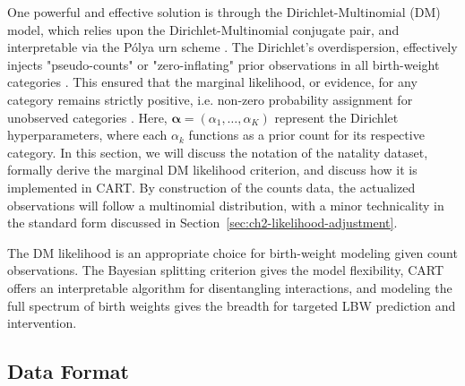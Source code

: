 One powerful and effective solution is through the Dirichlet-Multinomial (DM) model, which relies upon the Dirichlet-Multinomial conjugate pair, and interpretable via the Pólya urn scheme \citep{mimno_polya, gundersen2020dirichlet-multinomial, minka2000estimating}. The Dirichlet's overdispersion, effectively injects "pseudo-counts" or "zero-inflating" prior observations in all birth-weight categories \citep{mimno_polya, wiki:dirichlet-multinomial}. This ensured that the marginal likelihood, or evidence, for any category remains strictly positive, i.e. non-zero probability assignment for unobserved categories \citep{wiki:dirichlet-multinomial}. Here, \(\boldsymbol{\alpha} = (\alpha_1, \dots, \alpha_K)\) represent the Dirichlet hyperparameters, where each \(\alpha_k\) functions as a prior count for its respective category. In this section, we will discuss the notation of the natality dataset, formally derive the marginal DM likelihood criterion, and discuss how it is implemented in CART. By construction of the counts data, the actualized observations will follow a multinomial distribution, with a minor technicality in the standard form discussed in Section~\ref{sec:ch2-likelihood-adjustment}. 

The DM likelihood is an appropriate choice for birth-weight modeling given count observations. The Bayesian splitting criterion gives the model flexibility, CART offers an interpretable algorithm for disentangling interactions, and modeling the full spectrum of birth weights gives the breadth for targeted LBW prediction and intervention. 

\subsection{Data Format}
\label{sec:ch2-data-format}

